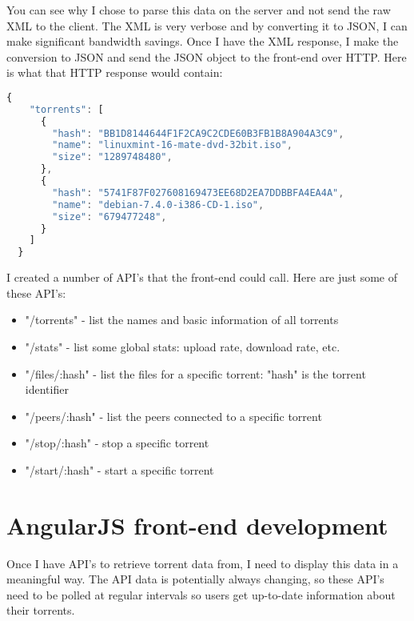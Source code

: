 You can see why I chose to parse this data on the server and not send the raw XML to the client. The XML is very verbose and by converting it to JSON, I can make significant bandwidth savings. Once I have the XML response, I make the conversion to JSON and send the JSON object to the front-end over HTTP. Here is what that HTTP response would contain:
\vspace{10px}
\begin{lstlisting}[caption=XML-RPC response converted to JSON, language=JavaScript]
  {
    "torrents": [
      {
        "hash": "BB1D8144644F1F2CA9C2CDE60B3FB1B8A904A3C9",
        "name": "linuxmint-16-mate-dvd-32bit.iso",
        "size": "1289748480",
      },
      {
        "hash": "5741F87F027608169473EE68D2EA7DDBBFA4EA4A",
        "name": "debian-7.4.0-i386-CD-1.iso",
        "size": "679477248",
      }
    ]
  }
\end{lstlisting}

I created a number of API's that the front-end could call. Here are just some of these API's:

\begin{itemize}
	\item "/torrents" - list the names and basic information of all torrents
	\item "/stats" - list some global stats: upload rate, download rate, etc.
	\item "/files/:hash" - list the files for a specific torrent: "hash" is the torrent identifier
	\item "/peers/:hash" - list the peers connected to a specific torrent
	\item "/stop/:hash" - stop a specific torrent
	\item "/start/:hash" - start a specific torrent
\end{itemize}


\section{AngularJS front-end development}
Once I have API's to retrieve torrent data from, I need to display this data in a meaningful way. The API data is potentially always changing, so these API's need to be polled at regular intervals so users get up-to-date information about their torrents.















